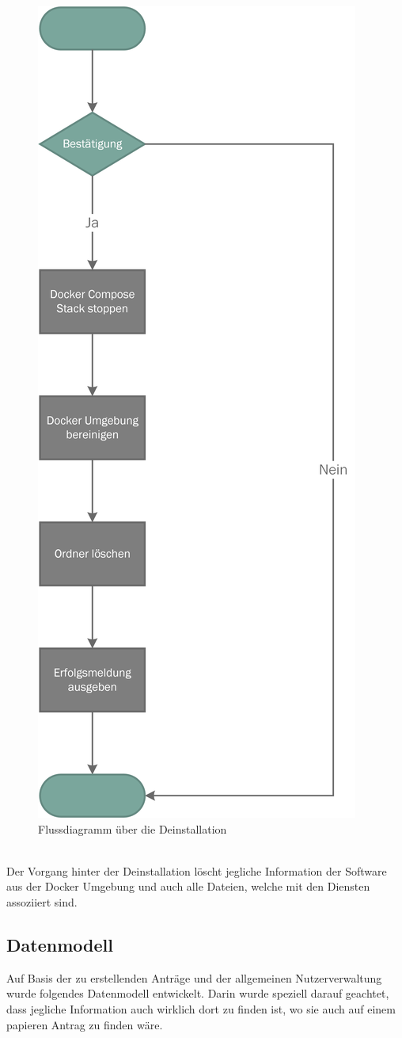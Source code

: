 \begin{figure}[H]
	\centering
	\includegraphics[width=0.48\linewidth]{images/mbeier_konzept/Purge}
	\caption[Flussdiagramm über die Deinstallation]{Flussdiagramm über die Deinstallation}
	\label{fig:purge}
\end{figure}
~\\
Der Vorgang hinter der Deinstallation löscht jegliche Information der Software aus der Docker Umgebung und auch alle Dateien, welche mit den Diensten assoziiert sind.

\newpage

\subsection{Datenmodell}

Auf Basis der zu erstellenden Anträge und der allgemeinen Nutzerverwaltung wurde folgendes Datenmodell entwickelt. Darin wurde speziell darauf geachtet, dass jegliche Information auch wirklich dort zu finden ist, wo sie auch auf einem papieren Antrag zu finden wäre. 


